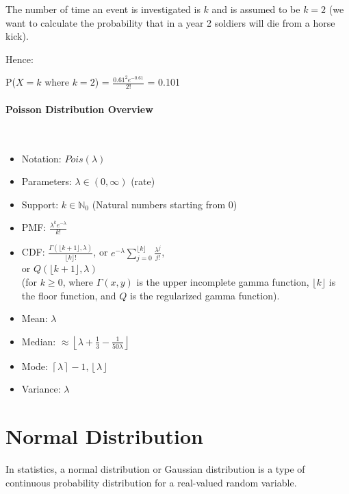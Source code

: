 \documentclass{article}
\begin{document}
The number of time an event is investigated is $k$ and is assumed to be $k = 2$ (we want to calculate the probability that in a year 2 soldiers will die from a horse kick).

Hence: 

P($X = k$ where $k = 2$) = $ \displaystyle \frac {0.61^{2}e^{-0.61 }}{2!} $ = 0.101 

\paragraph{Poisson Distribution Overview}\mbox{} \\

\begin{itemize}
    \item Notation: $Pois(\lambda)$
    \item Parameters: $ \displaystyle \lambda \in (0,\infty)$ (rate)
    \item Support: $ \displaystyle k\in \mathbb {N} _{0}$ (Natural numbers starting from 0) 
    \item PMF: $ \displaystyle {\frac {\lambda ^{k}e^{-\lambda }}{k!}} $
    \item CDF: $ \displaystyle {\frac {\Gamma (\lfloor k+1\rfloor ,\lambda )}{\lfloor k\rfloor !}}$, or $\displaystyle e^{-\lambda }\sum _{j=0}^{\lfloor k\rfloor }{\frac {\lambda ^{j}}{j!}}$, \\ or $\displaystyle Q(\lfloor k+1\rfloor ,\lambda )$ \\ (for $\displaystyle k\geq 0$, where $\Gamma (x,y)$ is the upper incomplete gamma function, $ \displaystyle \lfloor k\rfloor $ is the floor function, and $Q$ is the regularized gamma function).
    \item Mean: $\lambda$
    \item Median: $ \displaystyle \approx \left\lfloor \lambda +{\frac {1}{3}}-{\frac {1}{50\lambda }}\right\rfloor $
    \item Mode: $ \displaystyle \left\lceil \lambda \right\rceil -1,\left\lfloor \lambda \right\rfloor $
    \item Variance: $ \lambda $ 
\end{itemize}

\clearpage

\section{Normal Distribution}
In statistics, a normal distribution or Gaussian distribution is a type of continuous probability distribution for a real-valued random variable. 
\end{document}
